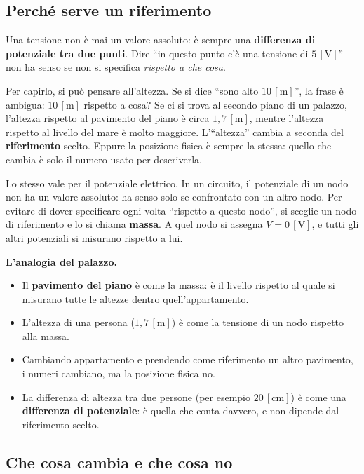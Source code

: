 \subsection{Perché serve un riferimento}

Una tensione non è mai un valore assoluto: è sempre una \textbf{differenza di potenziale tra due punti}. Dire ``in questo punto c'è una tensione di \(5\,[\text{V}]\)'' non ha senso se non si specifica \emph{rispetto a che cosa}.

Per capirlo, si può pensare all'altezza. Se si dice ``sono alto \(10\,[\text{m}]\)'', la frase è ambigua: \(10\,[\text{m}]\) rispetto a cosa? Se ci si trova al secondo piano di un palazzo, l'altezza rispetto al pavimento del piano è circa \(1{,}7\,[\text{m}]\), mentre l'altezza rispetto al livello del mare è molto maggiore. L'``altezza'' cambia a seconda del \textbf{riferimento} scelto. Eppure la posizione fisica è sempre la stessa: quello che cambia è solo il numero usato per descriverla.

Lo stesso vale per il potenziale elettrico. In un circuito, il potenziale di un nodo non ha un valore assoluto: ha senso solo se confrontato con un altro nodo. Per evitare di dover specificare ogni volta ``rispetto a questo nodo'', si sceglie un nodo di riferimento e lo si chiama \textbf{massa}. A quel nodo si assegna \(V = 0\,[\text{V}]\), e tutti gli altri potenziali si misurano rispetto a lui.

\begin{esempio}
\textbf{L'analogia del palazzo.}
\begin{itemize}[leftmargin=1cm]
  \item Il \textbf{pavimento del piano} è come la massa: è il livello rispetto al quale si misurano tutte le altezze dentro quell'appartamento.
  \item L'altezza di una persona (\(1{,}7\,[\text{m}]\)) è come la tensione di un nodo rispetto alla massa.
  \item Cambiando appartamento e prendendo come riferimento un altro pavimento, i numeri cambiano, ma la posizione fisica no.
  \item La differenza di altezza tra due persone (per esempio \(20\,[\text{cm}]\)) è come una \textbf{differenza di potenziale}: è quella che conta davvero, e non dipende dal riferimento scelto.
\end{itemize}
\end{esempio}

\subsection{Che cosa cambia e che cosa no}

